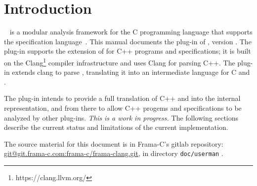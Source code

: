 \chapter{Introduction}

\framac~\cite{userman,fac15} is a modular analysis framework for the C
programming language that supports the \acsl specification
language~\cite{acsl}. This manual documents the \fclang plug-in of \framac,
version \fclangversion. 
The \fclang plug-in supports the \acslpp extension of \acsl for C++ programs and specifications; 
it is built on the Clang\footnote{https://clang.llvm.org/} compiler infrastructure and uses Clang for 
parsing C++. The plug-in extends clang to parse \acslpp, translating it into an intermediate language for C and \acsl.

The \fclang plug-in intends to provide a full translation of C++ and \acslpp into the \framac internal representation, and from there to allow C++ progems and \acslpp specifications to be analyzed by other \framac plug-ins. 
\textit{This is a work in progress.}
The following sections describe the current status and limitations of the current implementation.

The source material for this document is in Frama-C's gitlab repository: \url{git@git.frama-c.com:frama-c/frama-clang.git}, in directory \lstinline|doc/userman| .

